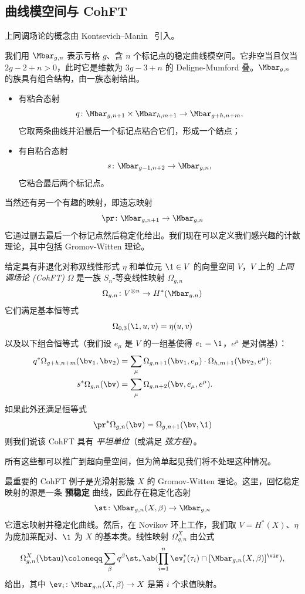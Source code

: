 \subsection{曲线模空间与 CohFT}%
\label{sub:Moduli of curves and CohFTs}

上同调场论的概念由 Kontsevich--Manin~\cite{KM1994} 引入。

我们用 $\Mbar_{g,n}$ 表示亏格 $g$、含 $n$ 个标记点的稳定曲线模空间。它非空当且仅当 $2g-2+n > 0$，此时它是维数为 $3g-3+n$ 的 Deligne-Mumford 叠。$\Mbar_{g,n}$ 的族具有组合结构，由一族态射给出。
\begin{itemize}
    \item 有粘合态射
        \[q \colon \Mbar_{g,n+1} \times \Mbar_{h, m+1} \to \Mbar_{g+h,n+m}, \]
        它取两条曲线并沿最后一个标记点粘合它们，形成一个结点；
    \item 有自粘合态射 \[s \colon \Mbar_{g-1,n+2} \to \Mbar_{g,n},\]
        它粘合最后两个标记点。
\end{itemize}
当然还有另一个有趣的映射，即遗忘映射
\[ \pr \colon \Mbar_{g,n+1} \to \Mbar_{g,n} \]
它通过删去最后一个标记点然后稳定化给出。我们现在可以定义我们感兴趣的计数理论，其中包括 Gromov-Witten 理论。

\begin{defn}
    给定具有非退化对称双线性形式 $\eta$ 和单位元 $\1 \in V$ 的向量空间 $V$，$V$ 上的 \textit{上同调场论 (CohFT)} $\Omega$ 是一族 $S_n$-等变线性映射 $\Omega_{g,n}$
    \[ \Omega_{g,n} \colon V^{\otimes n} \to H^*(\Mbar_{g,n}) \]
    它们满足基本恒等式
    \[ \Omega_{0,3}(\1, u,v) = \eta(u,v) \]
    以及以下组合恒等式（我们设 $e_{\mu}$ 是 $V$ 的一组基使得 $e_1 = \1$，$e^{\mu}$ 是对偶基）：
    \begin{align*}
        q^* \Omega_{g+h,n+m}(\bv_1, \bv_2) &= \sum_{\mu} \Omega_{g,n+1}(\bv_1, e_{\mu}) \cdot \Omega_{h,m+1}(  \bv_2, e^{\mu} ); \\
        s^* \Omega_{g,n}(\bv) &= \sum_{\mu} \Omega_{g,n+2}(\bv, e_{\mu}, e^{\mu}).
    \end{align*}
    如果此外还满足恒等式
    \[ \pr^*\Omega_{g,n}(\bv) = \Omega_{g,n+1}(\bv,\1) \]
    则我们说该 CohFT 具有 \textit{平坦单位}（或满足 \textit{弦方程}）。
\end{defn}
所有这些都可以推广到超向量空间，但为简单起见我们将不处理这种情况。

\begin{exm}
    最重要的 CohFT 例子是光滑射影簇 $X$ 的 Gromov-Witten 理论。这里，回忆稳定映射的源是一条 \textbf{预稳定} 曲线，因此存在稳定化态射
    \[ \st \colon \Mbar_{g,n}(X,\beta) \to \Mbar_{g,n} \]
    它遗忘映射并稳定化曲线。然后，在 Novikov 环上工作，我们取 $V = H^*(X)$、$\eta$ 为庞加莱配对、$\1$ 为 $X$ 的基本类。线性映射 $\Omega^X_{g,n}$ 由公式
    \[ \Omega_{g,n}^X(\btau) \coloneqq \sum_{\beta} q^{\beta} \st_* \ab(\prod_{i=1}^n \ev_i^*(\tau_i) \cap [\Mbar_{g,n}(X,\beta)]^{\vir}), \]
    给出，其中 $\ev_i \colon \Mbar_{g,n}(X,\beta) \to X$ 是第 $i$ 个求值映射。
\end{exm}


